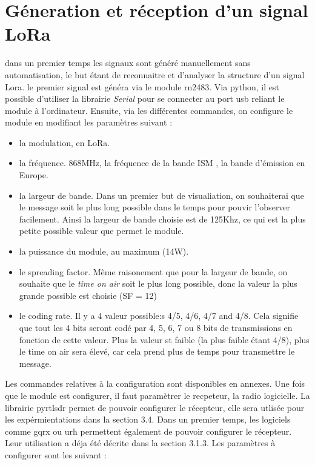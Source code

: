 \section{Géneration et réception d'un signal LoRa} \label{signallora}

dans un premier temps les signaux sont généré manuellement sans automatisation, le but étant de reconnaitre et d'analyser la structure d'un signal Lora. le premier signal est généra via le module rn2483. Via python, il est possible d'utiliser la librairie \textit{Serial} pour se connecter au port usb reliant le module à l'ordinateur. Ensuite, via les différentes commandes, on configure le module en modifiant les paramètres suivant : 

\begin{itemize}
\item la modulation, en LoRa.
\item la fréquence. 868MHz, la fréquence de la bande ISM , la bande d'émission en Europe.
\item la largeur de bande. Dans un premier but de visualiation, on souhaiterai que le message soit le plus long possible dans le temps pour pouvir l'observer facilement. Ainsi la largeur de bande choisie est de 125Khz, ce qui est la plus petite possible valeur que permet le module.
\item la puissance du module, au maximum (14W).
\item le spreading factor. Même raisonement que pour la largeur de bande, on souhaite que le \textit{time on air} soit le plus long possible, donc la valeur la plus grande possible est choisie (SF = 12)
\item le coding rate. Il y a 4 valeur possible:s 4/5, 4/6, 4/7 and 4/8. Cela signifie que tout les 4 bits seront codé par 4, 5, 6, 7 ou 8 bits de transmissions en fonction de cette valeur. Plus la valeur st faible (la plus faible étant 4/8), plus le time on air sera élevé, car cela prend plus de temps pour transmettre le message.
\end{itemize}

Les commandes relatives à la configuration sont disponibles en annexes.
Une fois que le module est configurer, il faut paramètrer le recpeteur, la radio logicielle. La librairie pyrtlsdr permet de pouvoir configurer le récepteur, elle sera utlisée pour les expérmientations dans la section 3.4. Dans un premier temps, les logiciels comme gqrx ou urh permettent également de pouvoir configurer le récepteur. Leur utilisation a déja été décrite dans la section 3.1.3. Les paramètres à configurer sont les suivant : 

